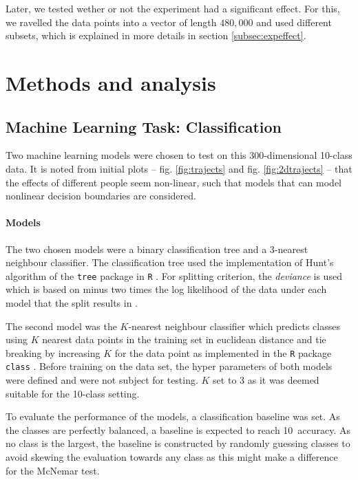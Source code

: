 \documentclass[11pt,fleqn]{article}
\begin{document}
Later, we tested wether or not the experiment had a significant effect.
For this, we ravelled the data points into a vector of length $ 480,000 $ and used different subsets, which is explained in more details in section \ref{subsec:expeffect}.



\section{Methods and analysis}


\subsection{Machine Learning Task: Classification}
Two machine learning models were chosen to test on this 300-dimensional 10-class data.
It is noted from initial plots -- fig. \ref{fig:trajects} and fig. \ref{fig:2dtrajects} -- that the effects of different people seem non-linear, such that models that can model nonlinear decision boundaries are considered.


\paragraph{Models} The two chosen models were a binary classification tree and a 3-nearest neighbour classifier. The classification tree used the implementation of Hunt's algorithm of the \texttt{tree} package in \texttt{R} \cite{Tree}. For splitting criterion, the \textit{deviance} is used which is based on minus two times the log likelihood of the data under each model that the split results in \cite{Deviance}.

The second model was the \(K\)-nearest neighbour classifier which predicts classes using \(K\) nearest data points in the training set in euclidean distance and tie breaking by increasing \(K\) for the data point as implemented in the \texttt{R} package \texttt{class} \cite{KNN}. Before training on the data set, the hyper parameters of both models were defined and were not subject for testing. \(K\) set to 3 as it was deemed suitable for the 10-class setting.

To evaluate the performance of the models, a classification baseline was set. As the classes are perfectly balanced, a baseline is expected to reach 10\pro\ accuracy. As no class is the largest, the baseline is constructed by randomly guessing classes to avoid skewing the evaluation towards any class as this might make a difference for the McNemar test.
\end{document}
